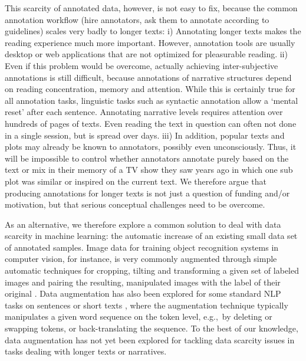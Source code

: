 \documentclass[10pt, a4paper]{article}
\begin{document}
This scarcity of annotated data, however, is not easy to fix, because the common annotation workflow (hire annotators, ask them to annotate according to guidelines) scales very badly to longer texts: i) Annotating longer texts makes the reading experience much more important. However, annotation tools are usually desktop or web applications that are not optimized for pleasurable reading. ii) Even if this problem would be overcome, actually achieving inter-subjective annotations is still difficult, because annotations of narrative structures depend on reading concentration, memory and attention. While this is certainly true for all annotation tasks, linguistic tasks such as syntactic annotation allow a `mental reset' after each sentence. Annotating narrative levels requires attention over hundreds of pages of texts. Even reading the text in question can often not done in a single session, but is spread over days.
iii) In addition, popular texts and plots may already be known to annotators, possibly even unconsciously. Thus, it will be impossible to control whether annotators annotate purely based on the text or mix in their memory of a TV show they saw years ago in which one sub plot was similar or inspired on the current text. We therefore argue that producing annotations for longer texts is not just a question of funding and/or motivation, but that serious conceptual challenges need to be overcome.

As an alternative, we therefore explore a common solution to deal with data scarcity in machine learning: the automatic increase of an existing small data set of annotated samples.
Image data for training object recognition systems in computer vision, for instance, is very commonly augmented through simple automatic techniques for cropping, tilting and transforming a given set of labeled images and pairing the resulting, manipulated images with the label of their original \cite{howard2013some,szegedy2015going}. 
Data augmentation has also been explored for some standard NLP tasks on sentences or short texts \cite{wang-etal-2018-switchout,wei-zou-2019-eda,liu-etal-2020-data}, where the augmentation technique typically manipulates a given word sequence on the token level, e.g.,~by deleting or swapping tokens, or back-translating the sequence.
To the best of our knowledge, data augmentation has not yet been explored for tackling data scarcity issues in tasks dealing with longer texts or narratives. 
\end{document}
